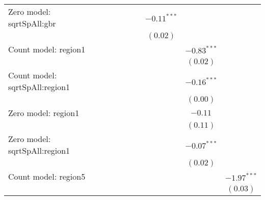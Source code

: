 \begin{sidewaystable}
\begin{center}
{\begin{tabular}{l c c c c c c c c c}
Zero model: sqrtSpAll:gbr      &               &               &               &                 &               &               & $-0.11^{***}$ &                &               \\
                               &               &               &               &                 &               &               & $(0.02)$      &                &               \\
Count model: region1           &               &               &               &                 &               &               &               & $-0.83^{***}$  &               \\
                               &               &               &               &                 &               &               &               & $(0.02)$       &               \\
Count model: sqrtSpAll:region1 &               &               &               &                 &               &               &               & $-0.16^{***}$  &               \\
                               &               &               &               &                 &               &               &               & $(0.00)$       &               \\
Zero model: region1            &               &               &               &                 &               &               &               & $-0.11$        &               \\
                               &               &               &               &                 &               &               &               & $(0.11)$       &               \\
Zero model: sqrtSpAll:region1  &               &               &               &                 &               &               &               & $-0.07^{***}$  &               \\
                               &               &               &               &                 &               &               &               & $(0.02)$       &               \\
Count model: region5           &               &               &               &                 &               &               &               &                & $-1.97^{***}$ \\
                               &               &               &               &                 &               &               &               &                & $(0.03)$      \\

\end{tabular}}
\end{center}
\end{sidewaystable}
